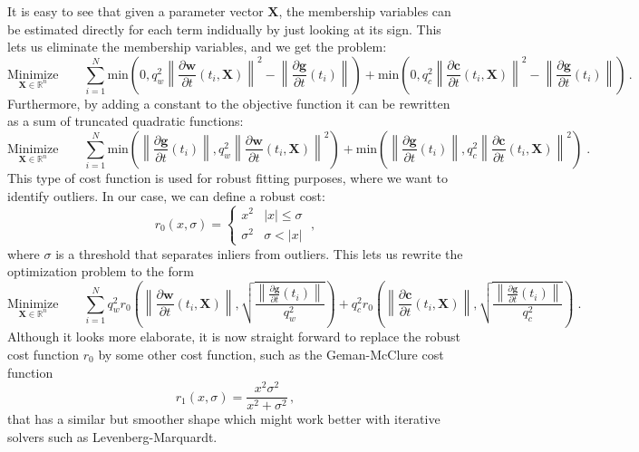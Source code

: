 \documentclass{article}
\newcommand{\quality}[1]{q_{#1}}
\newcommand{\minfun}{\text{min}}
\newcommand{\realvec}[1]{\mathbf{#1}}
\newcommand{\norm}[1]{\left\| #1 \right\|}
\newcommand{\derivative}[2]{\frac{\partial #1}{\partial #2}}
\newcommand{\timederivative}[1]{\derivative{#1}{t}}
\newcommand{\realnumber}{\mathbb{R}}
\begin{document}
It is easy to see that given a parameter vector $\realvec{X}$, the membership variables can be estimated directly for each term indidually by just looking at its sign. This lets us eliminate the membership variables, and we get the problem:
\begin{displaymath}
\underset{\realvec{X} \in \realnumber^n}{\text{Minimize}} \qquad \sum_{i = 1}^N  \minfun\left(0, \quality{w}^2\norm{\timederivative{\realvec{w}}(t_i, \realvec{X})}^2 - \norm{\timederivative{\realvec{g}}(t_i)}\right)
+ \minfun\left(0, \quality{c}^2\norm{\timederivative{\realvec{c}}(t_i, \realvec{X})}^2 - \norm{\timederivative{\realvec{g}}(t_i)}\right) \, .
\end{displaymath}
Furthermore, by adding a constant to the objective function it can be rewritten as a sum of truncated quadratic functions:
\begin{displaymath}
\underset{\realvec{X} \in \realnumber^n}{\text{Minimize}} \qquad \sum_{i = 1}^N  \minfun\left(\norm{\timederivative{\realvec{g}}(t_i)}, \quality{w}^2\norm{\timederivative{\realvec{w}}(t_i, \realvec{X})}^2\right)
+ \minfun\left(\norm{\timederivative{\realvec{g}}(t_i)}, \quality{c}^2\norm{\timederivative{\realvec{c}}(t_i, \realvec{X})}^2\right) \; .
\end{displaymath}
This type of cost function is used for robust fitting purposes, where we want to identify outliers. In our case, we can define a robust cost:
\begin{displaymath}
r_0(x, \sigma) =
\left\{
\begin{array}{ll}
  x^2 & |x| \leqslant \sigma \\
  \sigma^2 & \sigma < |x|
\end{array}
\right. \; ,
\end{displaymath}
where $\sigma$ is a threshold that separates inliers from outliers. This lets us rewrite the optimization problem to the form
\begin{displaymath}
\underset{\realvec{X} \in \realnumber^n}{\text{Minimize}} \qquad \sum_{i = 1}^N 
\quality{w}^2r_0\left(\norm{\timederivative{\realvec{w}}(t_i, \realvec{X})}, \sqrt{\frac{\norm{\timederivative{\realvec{g}}(t_i)}}{\quality{w}^2}}\right) + 
\quality{c}^2r_0\left(\norm{\timederivative{\realvec{c}}(t_i, \realvec{X})}, \sqrt{\frac{\norm{\timederivative{\realvec{g}}(t_i)}}{\quality{c}^2}}\right)\; .
\end{displaymath}
Although it looks more elaborate, it is now straight forward to replace the robust cost function $r_0$ by some other cost function, such as the Geman-McClure cost function
\begin{displaymath}
r_1(x, \sigma) = \frac{x^2\sigma^2}{x^2 + \sigma^2}\,,
\end{displaymath}
that has a similar but smoother shape which might work better with iterative solvers such as Levenberg-Marquardt.
\end{document}
